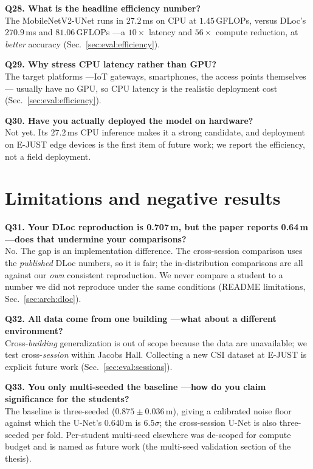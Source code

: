 \textbf{Q28. What is the headline efficiency number?}\\
The MobileNetV2-UNet runs in $27.2$\,ms on CPU at $1.45$\,GFLOPs, versus DLoc's $270.9$\,ms and
$81.06$\,GFLOPs ---a $10\times$ latency and $56\times$ compute reduction, at \emph{better} accuracy
(Sec.~\ref{sec:eval:efficiency}).

\textbf{Q29. Why stress CPU latency rather than GPU?}\\
The target platforms ---IoT gateways, smartphones, the access points themselves--- usually have no GPU,
so CPU latency is the realistic deployment cost (Sec.~\ref{sec:eval:efficiency}).

\textbf{Q30. Have you actually deployed the model on hardware?}\\
Not yet. Its $27.2$\,ms CPU inference makes it a strong candidate, and deployment on E-JUST edge devices
is the first item of future work; we report the efficiency, not a field deployment.

\section{Limitations and negative results}
\label{sec:qa:limits}

\textbf{Q31. Your DLoc reproduction is 0.707\,m, but the paper reports 0.64\,m ---does that undermine
your comparisons?}\\
No. The gap is an implementation difference. The cross-session comparison uses the \emph{published}
DLoc numbers, so it is fair; the in-distribution comparisons are all against our \emph{own} consistent
reproduction. We never compare a student to a number we did not reproduce under the same conditions
(README limitations, Sec.~\ref{sec:arch:dloc}).

\textbf{Q32. All data come from one building ---what about a different environment?}\\
Cross-\emph{building} generalization is out of scope because the data are unavailable; we test
cross-\emph{session} within Jacobs Hall. Collecting a new CSI dataset at E-JUST is explicit future work
(Sec.~\ref{sec:eval:sessions}).

\textbf{Q33. You only multi-seeded the baseline ---how do you claim significance for the students?}\\
The baseline is three-seeded ($0.875\pm0.036$\,m), giving a calibrated noise floor against which the
U-Net's 0.640\,m is $6.5\sigma$; the cross-session U-Net is also three-seeded per fold. Per-student
multi-seed elsewhere was de-scoped for compute budget and is named as future work
(the multi-seed validation section of the thesis).

